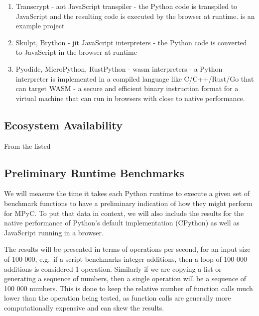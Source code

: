 \begin{enumerate}
\def\labelenumi{\arabic{enumi}.}
\tightlist
\item
  Transcrypt\autocite{transcryptRepo} - \gls{aot} JavaScript transpiler - the Python code is transpiled to JavaScript and the resulting code is executed by the browser at runtime. is an example project
\item
  Skulpt\autocite{skulptDocs}, Brython\autocite{brythonDocs} - \gls{jit} JavaScript interpreters - the Python code is converted to JavaScript in the browser at runtime
\item
  Pyodide\autocite{pyodideDocs}, MicroPython\autocite{microPythonDocs}, RustPython\autocite{rustPythonDocs} - \gls{wasm}\autocite{wasmDocs} interpreters - a Python interpreter is implemented in a compiled language like C/C++/Rust/Go that can target WASM - a secure and efficient binary instruction format for a virtual machine that can run in browsers with close to native performance.
\end{enumerate}

\subsection{Ecosystem Availability}\label{thesis__090-mpyc-web.md__ecosystem-availability-1}

From the listed

\subsection{Preliminary Runtime Benchmarks}\label{thesis__090-mpyc-web.md__preliminary-runtime-benchmarks-1}

We will measure the time it takes each Python runtime to execute a given set of benchmark functions to have a preliminary indication of how they might perform for MPyC. To put that data in context, we will also include the results for the native performance of Python's default implementation (CPython) as well as JavaScript running in a browser.

The results will be presented in terms of operations per second, for an input size of 100 000, e.g.~if a script benchmarks integer additions, then a loop of 100 000 additions is considered 1 operation. Similarly if we are copying a list or generating a sequence of numbers, then a single operation will be a sequence of 100 000 numbers. This is done to keep the relative number of function calls much lower than the operation being tested, as function calls are generally more computationally expensive and can skew the results.

